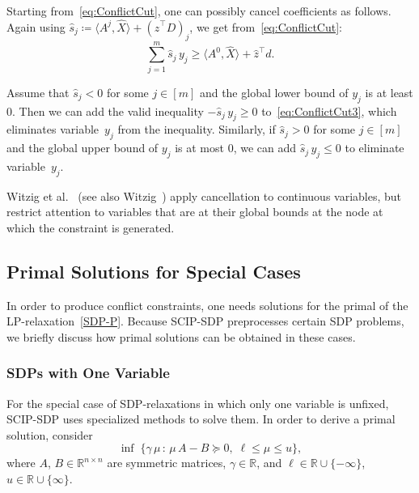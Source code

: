 \documentclass[10pt, a4paper]{article}
\newcommand{\suchthat}{\,:\,}
\newcommand{\define}{\coloneqq}
\newcommand{\skal}[2]{\langle{#1},{#2}\rangle}
\newcommand{\T}{^{\top}}
\newcommand{\R}{\mathds{R}}
\begin{document}
Starting from~\eqref{eq:ConflictCut}, one can possibly cancel coefficients
as follows. Again using
$\hat{s}_j \define \skal{A^j}{\hat{X}} + (\hat{z}\T D)_j$, we get
from~\eqref{eq:ConflictCut}:
\begin{equation}\label{eq:ConflictCut3}
  \sum_{j=1}^m \hat{s}_j\, y_j \geq \skal{A^0}{\hat{X}} + \hat{z}\T d.
\end{equation}

Assume that $\hat{s}_j < 0$ for some $j \in [m]$ and the global lower bound
of $y_j$ is at least 0. Then we can add the valid inequality
$-\hat{s}_j\, y_j \geq 0$ to~\eqref{eq:ConflictCut3}, which eliminates
variable~$y_j$ from the inequality. Similarly, if $\hat{s}_j > 0$ for some
$j \in [m]$ and the global upper bound of $y_j$ is at most 0, we can add
$\hat{s}_j\, y_j \leq 0$ to eliminate variable~$y_j$.

Witzig et al.~\cite{WitBH17} (see also Witzig~\cite{Wit22}) apply
cancellation to continuous variables, but restrict attention to variables
that are at their global bounds at the node at which the constraint is
generated.


\subsection{Primal Solutions for Special Cases}
\label{sec:Primal}

In order to produce conflict constraints, one needs solutions for the
primal of the LP-relaxation~\eqref{SDP-P}. Because SCIP-SDP preprocesses
certain SDP problems, we briefly discuss how primal solutions can be
obtained in these cases.

\subsubsection{SDPs with One Variable}

For the special case of SDP-relaxations in which only one variable is
unfixed, SCIP-SDP uses specialized methods to solve them. In order to
derive a primal solution, consider
\begin{equation}\label{eq:basic}
  \inf\; \{\gamma\, \mu \suchthat \mu\, A - B \succeq 0,\; \ell \leq \mu \leq u\},
\end{equation}
where $A$, $B \in \R^{n \times n}$ are symmetric matrices, $\gamma \in \R$,
and $\ell \in \R \cup \{-\infty\}$, $u \in \R \cup \{\infty\}$.
\end{document}
